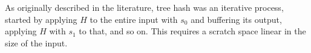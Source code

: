 \documentclass[sigconf, nonacm]{acmart}
\begin{document}







As originally described in the literature, tree hash was an iterative process, started by applying $H$ to the entire input with $s_0$ and buffering its output, applying $H$ with $s_1$ to that, and so on.
This requires a scratch space linear in the size of the input.
\end{document}
